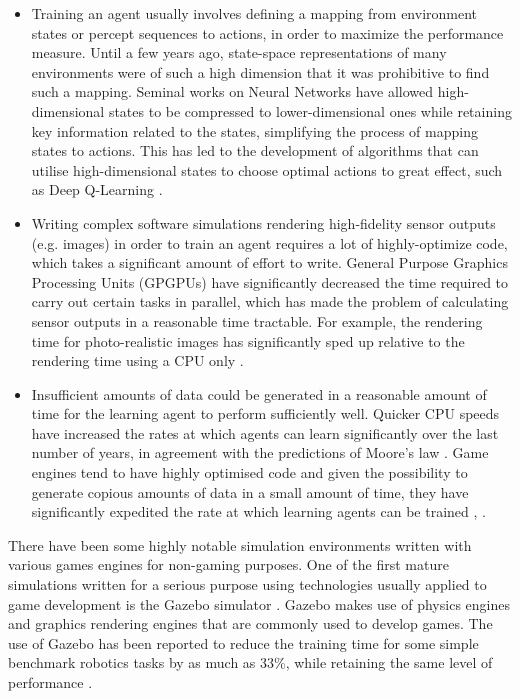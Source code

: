 \begin{itemize}
    \item
    Training an agent usually involves defining a mapping from environment states or percept sequences to actions, in order to maximize the performance measure. Until a few years ago, state-space representations of many environments were of such a high dimension that it was prohibitive to find such a mapping. Seminal works on Neural Networks \cite{Lecun1998Gradient-BasedRecognition} \cite{Krizhevsky2012ImageNetNetworks} have allowed high-dimensional states to be compressed to lower-dimensional ones while retaining key information related to the states, simplifying the process of mapping states to actions. This has led to the development of algorithms that can utilise high-dimensional states to choose optimal actions to great effect, such as Deep Q-Learning \cite{Mnih2013PlayingLearning}.
    \item Writing complex software simulations rendering high-fidelity sensor outputs (e.g. images) in order to train an agent requires a lot of highly-optimize code, which takes a significant amount of effort to write.
    General Purpose Graphics Processing Units (GPGPUs) have significantly decreased the time required to carry out certain tasks in parallel, which has made the problem of calculating sensor outputs in a reasonable time tractable. For example, the rendering time for photo-realistic images has significantly sped up relative to the rendering time using a CPU only \cite{Ryoo2008OptimizationCUDA}.
    \item Insufficient amounts of data could be generated in a reasonable amount of time for the learning agent to perform sufficiently well. Quicker CPU speeds have increased the rates at which agents can learn significantly over the last number of years, in agreement with the predictions of Moore's law \cite{MacK2011FiftyLaw}. Game engines tend to have highly optimised code and given the possibility to generate copious amounts of data in a small amount of time, they have significantly expedited the rate at which learning agents can be trained \cite{Juliani2018Unity:Agents}, \cite{SadeghiRL:World}. 
\end{itemize}

There have been some highly notable simulation environments written with various games engines for non-gaming purposes. One of the first mature simulations written for a serious purpose using technologies usually applied to game development is the Gazebo simulator \cite{Koenig2005DesignSimulator}. Gazebo makes use of physics engines and graphics rendering engines that are commonly used to develop games. The use of Gazebo has been reported to reduce the training time for some simple benchmark robotics tasks by as much as 33\%, while retaining the same level of performance \cite{Vilches2018RobotGazebo}. 

